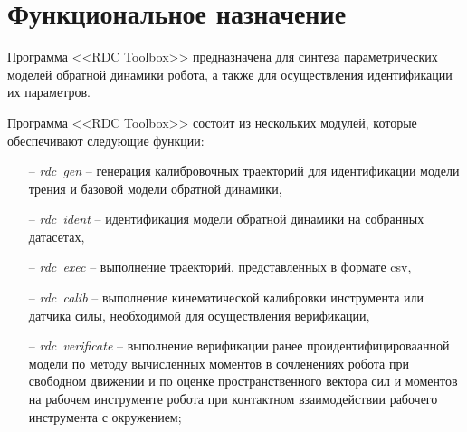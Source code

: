 \newpage
\section{Функциональное назначение}

Программа <<RDC Toolbox>> предназначена для синтеза параметрических моделей обратной динамики робота, а также для осуществления идентификации их параметров.

Программа <<RDC Toolbox>> состоит из нескольких модулей, которые обеспечивают следующие функции:
\begin{enumerate}
    \item[--] \textit{rdc~gen} -- генерация калибровочных траекторий для идентификации модели трения и базовой модели обратной динамики,
    \item[--] \textit{rdc~ident} -- идентификация модели обратной динамики на собранных датасетах,
    \item[--] \textit{rdc~exec} -- выполнение траекторий, представленных в формате csv,
    \item[--] \textit{rdc~calib} -- выполнение кинематической калибровки инструмента или датчика силы, необходимой для осуществления верификации,
    \item[--] \textit{rdc~verificate} -- выполнение верификации ранее проидентифицироваанной модели по методу вычисленных моментов в сочленениях робота при свободном движении и по оценке пространственного вектора сил и моментов на рабочем инструменте робота при контактном взаимодействии рабочего инструмента с окружением;
\end{enumerate}
